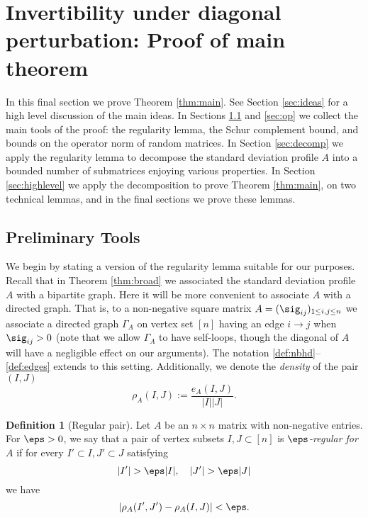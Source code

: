 \documentclass[aop,preprint]{imsart}
\theoremstyle{plain}
\theoremstyle{definition}
\newtheorem{definition}[theorem]{Definition}
\theoremstyle{remark}
\numberwithin{equation}{section}
\numberwithin{theorem}{section}
\begin{document}
\section{Invertibility under diagonal perturbation: Proof of main theorem}	\label{sec:diag}

In this final section we prove Theorem \ref{thm:main}. See Section \ref{sec:ideas} for a high level discussion of the main ideas. 
In Sections \ref{sec:tools} and \ref{sec:op} we collect the main tools of the proof: the regularity lemma, the Schur complement bound, and bounds on the operator norm of random matrices.
In Section \ref{sec:decomp} we apply the regularity lemma to decompose the standard deviation profile $A$ into a bounded number of submatrices enjoying various properties. 
In Section \ref{sec:highlevel} we apply the decomposition to prove Theorem \ref{thm:main}, on two technical lemmas, and in the final sections we prove these lemmas.



\subsection{Preliminary Tools}		\label{sec:tools}

We begin by stating a version of the regularity lemma suitable for our purposes.
Recall that in Theorem \ref{thm:broad} we associated the standard deviation profile $A$ with a bipartite graph. 
Here it will be more convenient to associate $A$ with a directed graph.
That is, to a non-negative square matrix $A=(\sig_{ij})_{1\le i,j\le n}$ we associate a directed graph $\Gamma_A$ on vertex set $[n]$ having an edge $i\rightarrow j$ when $\sig_{ij}>0$ (note that we allow $\Gamma_A$ to have self-loops, though the diagonal of $A$ will have a negligible effect on our arguments).
The notation \eqref{def:nbhd}--\eqref{def:edges} extends to this setting.
Additionally, we denote the \emph{density} of the pair $(I,J)$
\[
\rho_A(I,J):= \frac{e_A(I,J)}{|I||J|}.
\]

\begin{definition}[Regular pair]	\label{def:regular.pair}
Let $A$ be an $n\times n$ matrix with non-negative entries. 
For $\eps>0$, we say that a pair of vertex subsets $I,J\subset [n]$ is \emph{$\eps$-regular for $A$} if for every $I'\subset I, J'\subset J$ satisfying 
\[
|I'|> \eps |I|, \quad |J'|> \eps|J|
\]
we have
\[
|\rho_A(I',J')-\rho_A(I,J)|<\eps.
\]
\end{definition}
\end{document}
